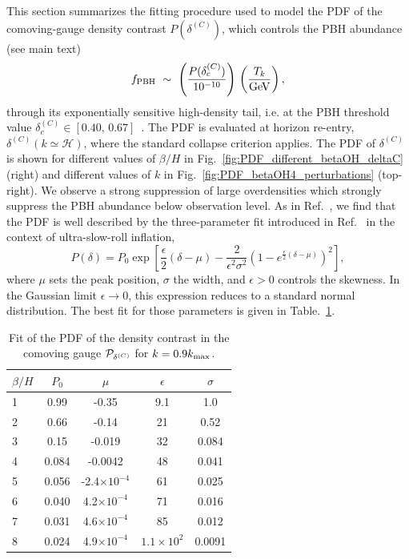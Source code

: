 \documentclass[twocolumn,superscriptaddress,aps,preprintnumbers,amsmath,amssymb,prl,footinbib]{revtex4-2}
\begin{document}
This section summarizes the fitting procedure used to model the PDF of the comoving-gauge density contrast $P(\delta^{(C)})$, which controls the PBH abundance (see main text)
\begin{equation}
f_{\rm PBH} ~\sim~
\left (\frac{P(\delta_c^{(C)})}{10^{-10}}\right )\,
\left (\frac{T_{k}}{\rm GeV} \right ),
\end{equation}
through its exponentially sensitive high-density tail, i.e. at the PBH threshold value $\delta_c^{(C)} \in [0.40,\,0.67]$~\cite{Musco:2018rwt,Escriva:2019phb,Escriva:2021aeh}. The PDF is evaluated at horizon re-entry, $\delta^{(C)}(k\simeq\mathcal{H})$, where the standard collapse criterion applies.
The PDF of $\delta^{(C)}$ is shown for different values of $\beta/H$ in Fig.~\ref{fig:PDF_different_betaOH_deltaC} (right) and different values of $k$ in Fig.~\ref{fig:PDF_betaOH4_perturbations} (top-right).  We observe a strong suppression of large overdensities which strongly suppress the PBH abundance below observation level.
As in Ref.~\cite{Lewicki:2024ghw}, we find that the PDF is well described by the three-parameter fit introduced in
Ref.~\cite{Tomberg:2023kli} in the context of ultra-slow-roll inflation,
\begin{equation}
\label{eq:fit_function_app}
P(\delta) = P_0\exp\!\left[\frac{\epsilon}{2}(\delta-\mu)
- \frac{2}{\epsilon^2\sigma^2}
\left(1 - e^{\frac{\epsilon}{2}(\delta-\mu)}\right)^2\right],
\end{equation}
where $\mu$ sets the peak position, $\sigma$ the width, and $\epsilon>0$ controls the skewness. In the Gaussian limit $\epsilon\to0$, this expression reduces to a standard normal distribution. The best fit for those parameters is given in Table.~\ref{tab:sample}.

{
\renewcommand{\arraystretch}{1.4}
\setlength{\tabcolsep}{15pt}
\begin{table}[h]
    \centering
    \begin{tabular}{|l|c|c|c|c|}
\hline
$\beta/H$ & $P_0$ & $\mu$ & $\epsilon$ & $\sigma$
\\
\hline
\hline
1 & 0.99 & -0.35 & 9.1 & 1.0
\\
\hline
2 & 0.66 & -0.14 & 21 & 0.52
\\
\hline
3 & 0.15 & -0.019 & 32 & 0.084
\\
\hline
4 & 0.084 & -0.0042 & 48 & 0.041
\\
\hline
5 & 0.056 & -2.4$\times10^{-4}$ & 61 & 0.025
\\
\hline
6 & 0.040 & 4.2$\times10^{-4}$ & 71 & 0.016
\\
\hline
7 & 0.031 & 4.6$\times10^{-4}$ & 85 & 0.012
\\
\hline
8 & 0.024 & 4.9$\times10^{-4}$ & $1.1\times10^{2}$ & 0.0091
\\
\hline
\end{tabular}
\caption{\label{tab:sample}
Fit of the PDF of the density contrast in the comoving gauge ${\cal P}_{\delta^{(C)}}$ for $k=0.9k_{\rm max}$.}
\end{table}
}
\end{document}
